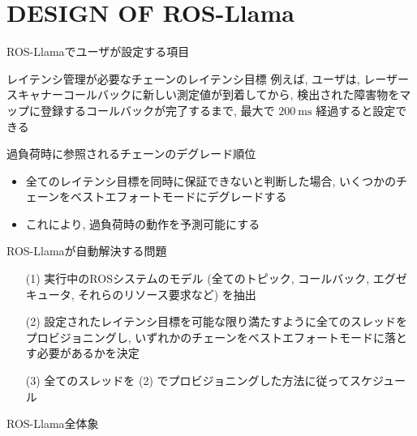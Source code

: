 
\section{DESIGN OF ROS-Llama}
\label{sec: design of ros-llama}

\begin{frame}{ROS-Llamaでユーザが設定する項目}
    \begin{block}{レイテンシ管理が必要なチェーンのレイテンシ目標}
        例えば, ユーザは, レーザースキャナーコールバックに新しい測定値が到着してから, 検出された障害物をマップに登録するコールバックが完了するまで, 最大で $200 \mathrm{~ms}$ 経過すると設定できる
    \end{block}
    \begin{block}{過負荷時に参照されるチェーンのデグレード順位}
        \setlength{\linewidth}{0.98\columnwidth}
        \begin{itemize}
            \item 全てのレイテンシ目標を同時に保証できないと判断した場合, いくつかのチェーンをベストエフォートモードにデグレードする
            \item これにより, 過負荷時の動作を予測可能にする
        \end{itemize}
    \end{block}
\end{frame}

\begin{frame}{ROS-Llamaが自動解決する問題}
    \begin{enumerate}
        \item[(1)] 実行中のROSシステムのモデル (全てのトピック, コールバック, エグゼキュータ, それらのリソース要求など) を抽出
        \item[(2)] 設定されたレイテンシ目標を可能な限り満たすように全てのスレッドをプロビジョニングし, いずれかのチェーンをベストエフォートモードに落とす必要があるかを決定
        \item[(3)] 全てのスレッドを (2) でプロビジョニングした方法に従ってスケジュール
    \end{enumerate}
\end{frame}

\begin{frame}{ROS-Llama全体象}
\end{frame}

